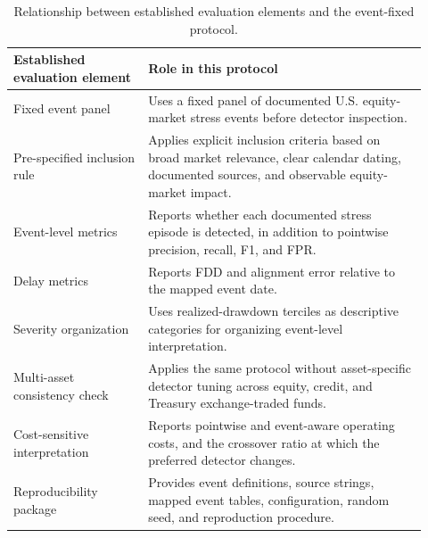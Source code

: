 \documentclass{book}
\begin{document}
\begin{table}[!tbp]
\centering
\caption{Relationship between established evaluation elements and the event-fixed protocol.}
\label{tab:protocol_comparison}
\scriptsize
\begin{tabular}{p{0.30\linewidth}p{0.62\linewidth}}
\toprule
Established evaluation element & Role in this protocol\\
\midrule
Fixed event panel & Uses a fixed panel of documented U.S. equity-market stress events before detector inspection.\\
Pre-specified inclusion rule & Applies explicit inclusion criteria based on broad market relevance, clear calendar dating, documented sources, and observable equity-market impact.\\
Event-level metrics & Reports whether each documented stress episode is detected, in addition to pointwise precision, recall, F1, and FPR.\\
Delay metrics & Reports FDD and alignment error relative to the mapped event date.\\
Severity organization & Uses realized-drawdown terciles as descriptive categories for organizing event-level interpretation.\\
Multi-asset consistency check & Applies the same protocol without asset-specific detector tuning across equity, credit, and Treasury exchange-traded funds.\\
Cost-sensitive interpretation & Reports pointwise and event-aware operating costs, and the crossover ratio at which the preferred detector changes.\\
Reproducibility package & Provides event definitions, source strings, mapped event tables, configuration, random seed, and reproduction procedure.\\
\bottomrule
\end{tabular}
\end{table}
\end{document}
